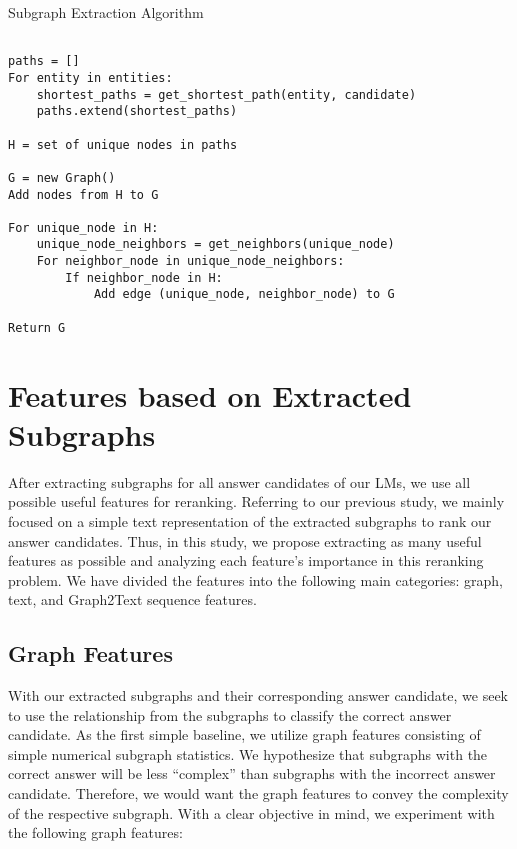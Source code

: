 \begin{ListingEnv}[p]
    \centering %
    \caption{Subgraph Extraction Algorithm} 
    \label{alg:controllable_fusion:sub_extract} 
    \begin{lstlisting}[basicstyle=\fontsize{10pt}{12pt}\selectfont\ttfamily] % Smaller font for code Require: entities, candidate

paths = []
For entity in entities:
    shortest_paths = get_shortest_path(entity, candidate)
    paths.extend(shortest_paths)

H = set of unique nodes in paths

G = new Graph()
Add nodes from H to G

For unique_node in H:
    unique_node_neighbors = get_neighbors(unique_node)
    For neighbor_node in unique_node_neighbors:
        If neighbor_node in H:
            Add edge (unique_node, neighbor_node) to G

Return G
    \end{lstlisting}
\end{ListingEnv}


\section{Features based on Extracted Subgraphs}
\label{sec:controllable_fusion:subgraph_features}
After extracting subgraphs for all answer candidates of our LMs, we use all possible useful features for reranking. Referring to our previous study, we mainly focused on a simple text representation of the extracted subgraphs to rank our answer candidates. Thus, in this study, we propose extracting as many useful features as possible and analyzing each feature's importance in this reranking problem. We have divided the features into the following main categories: graph, text, and Graph2Text sequence features. 

\subsection{Graph Features}
\label{sec:controllable_fusion:graph_features}
With our extracted subgraphs and their corresponding answer candidate, we seek to use the relationship from the subgraphs to classify the correct answer candidate. As the first simple baseline, we utilize graph features consisting of simple numerical subgraph statistics. We hypothesize that subgraphs with the correct answer will be less ``complex'' than subgraphs with the incorrect answer candidate. Therefore, we would want the graph features to convey the complexity of the respective subgraph. With a clear objective in mind, we experiment with the following graph features:  

